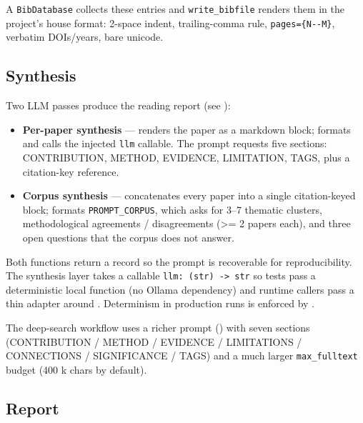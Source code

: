 \documentclass[
]{article}
\providecommand{\tightlist}{%
  \setlength{\itemsep}{0pt}\setlength{\parskip}{0pt}}
\begin{document}
A \texttt{BibDatabase} collects these entries and
\texttt{write\_bibfile} renders them in the project's house format:
2-space indent, trailing-comma rule, \texttt{pages=\{N-\/-M\}}, verbatim
DOIs/years, bare unicode.

\subsection{Synthesis}\label{synthesis}

Two LLM passes produce the reading report (see
):

\begin{itemize}
\tightlist
\item
  \textbf{Per-paper synthesis} ---
  renders the paper as a markdown block; 
  formats  and calls the injected
  \texttt{llm} callable. The prompt requests five sections:
  CONTRIBUTION, METHOD, EVIDENCE, LIMITATION, TAGS, plus a citation-key
  reference.
\item
  \textbf{Corpus synthesis} --- 
  concatenates every paper into a single citation-keyed block;
   formats \texttt{PROMPT\_CORPUS}, which
  asks for 3--7 thematic clusters, methodological agreements /
  disagreements (\texorpdfstring{\textgreater{}=}{>=} 2 papers each), and three open questions that the
  corpus does not answer.
\end{itemize}

Both functions return a
 record so the
prompt is recoverable for reproducibility. The synthesis layer takes a
callable \texttt{llm:\ (str)\ -\textgreater{}\ str} so tests pass a
deterministic local function (no Ollama dependency) and runtime callers
pass a thin adapter around .
Determinism in production runs is enforced by
.

The deep-search workflow uses a richer prompt
() with seven sections
(CONTRIBUTION / METHOD / EVIDENCE / LIMITATIONS / CONNECTIONS /
SIGNIFICANCE / TAGS) and a much larger \texttt{max\_fulltext} budget
(400 k chars by default).

\subsection{Report}\label{report}
\end{document}
